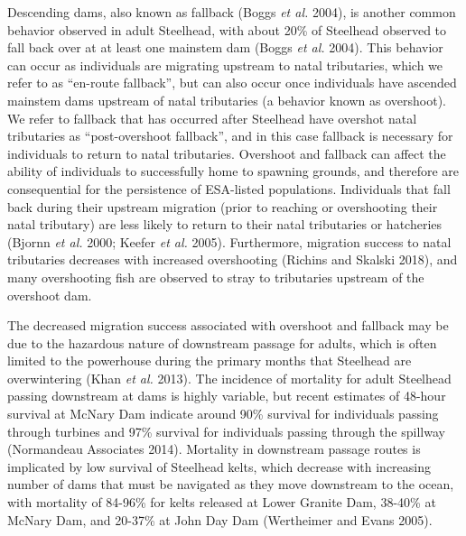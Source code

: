 \documentclass[
  12pt,
]{report}
\begin{document}
Descending dams, also known as fallback (Boggs \emph{et al.} 2004), is
another common behavior observed in adult Steelhead, with about 20\% of
Steelhead observed to fall back over at at least one mainstem dam (Boggs
\emph{et al.} 2004). This behavior can occur as individuals are
migrating upstream to natal tributaries, which we refer to as ``en-route
fallback'', but can also occur once individuals have ascended mainstem
dams upstream of natal tributaries (a behavior known as overshoot). We
refer to fallback that has occurred after Steelhead have overshot natal
tributaries as ``post-overshoot fallback'', and in this case fallback is
necessary for individuals to return to natal tributaries. Overshoot and
fallback can affect the ability of individuals to successfully home to
spawning grounds, and therefore are consequential for the persistence of
ESA-listed populations. Individuals that fall back during their upstream
migration (prior to reaching or overshooting their natal tributary) are
less likely to return to their natal tributaries or hatcheries (Bjornn
\emph{et al.} 2000; Keefer \emph{et al.} 2005). Furthermore, migration
success to natal tributaries decreases with increased overshooting
(Richins and Skalski 2018), and many overshooting fish are observed to
stray to tributaries upstream of the overshoot dam.

The decreased migration success associated with overshoot and fallback
may be due to the hazardous nature of downstream passage for adults,
which is often limited to the powerhouse during the primary months that
Steelhead are overwintering (Khan \emph{et al.} 2013). The incidence of
mortality for adult Steelhead passing downstream at dams is highly
variable, but recent estimates of 48-hour survival at McNary Dam
indicate around 90\% survival for individuals passing through turbines
and 97\% survival for individuals passing through the spillway
(Normandeau Associates 2014). Mortality in downstream passage routes is
implicated by low survival of Steelhead kelts, which decrease with
increasing number of dams that must be navigated as they move downstream
to the ocean, with mortality of 84-96\% for kelts released at Lower
Granite Dam, 38-40\% at McNary Dam, and 20-37\% at John Day Dam
(Wertheimer and Evans 2005).
\end{document}
